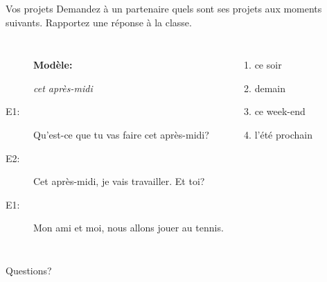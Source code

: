 \documentclass{beamer}
\begin{document}
  \begin{frame}{Vos projets}
    Demandez à un partenaire quels sont ses projets aux moments suivants.
    Rapportez une réponse à la classe. \\
    \begin{columns}
        \begin{description}
          \item[] \textbf{Modèle:}
          \item[] \emph{cet après-midi}
          \item[E1:] Qu'est-ce que tu vas faire cet après-midi?
          \item[E2:] Cet après-midi, je vais travailler. Et toi?
          \item[E1:] Mon ami et moi, nous allons jouer au tennis.
        \end{description}
        \begin{enumerate}
          \item ce soir
          \item demain
          \item ce week-end
          \item l'été prochain
        \end{enumerate}
    \end{columns}
  \end{frame}

  \begin{frame}{}
    \begin{center}
      \Large Questions?
    \end{center}
  \end{frame}
\end{document}
